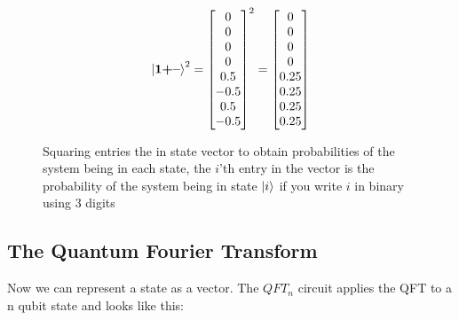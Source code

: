 \begin{figure}[H]
    \centering
    \begin{gather*}
        \ket{\mathbf{1}\textbf{+}\textbf{--}}^2=
        \begin{bmatrix}
            0\\
            0\\
            0\\
            0\\
            0.5\\
            -0.5\\
            0.5\\
            -0.5\\
        \end{bmatrix}^2
        =
        \begin{bmatrix}
            0\\
            0\\
            0\\
            0\\
            0.25\\
            0.25\\
            0.25\\
            0.25\\
        \end{bmatrix}
    \end{gather*}
    \caption{Squaring entries the in state vector to obtain probabilities of the system being in each state, the $i$'th entry in the vector is the probability of the system being in state $\ket{i}$ if you write $i$ in binary using 3 digits}
    \label{fig:square_state}
\end{figure}

\subsection{The Quantum Fourier Transform}
Now we can represent a state as a vector. The $QFT_n$ circuit applies the QFT to a n qubit state and looks like this:

